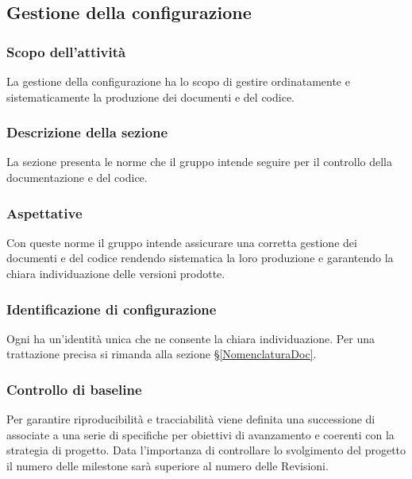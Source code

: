 \subsection{Gestione della configurazione}
\subsubsection{Scopo dell'attività} \label{PSup_GestioneConf_Scopo}
La gestione della configurazione ha lo scopo di gestire ordinatamente e sistematicamente la produzione dei documenti e del codice.

\subsubsection{Descrizione della sezione} 
La sezione presenta le norme che il gruppo intende seguire per il controllo della documentazione e del codice.

\subsubsection{Aspettative}
Con queste norme il gruppo intende assicurare una corretta gestione dei documenti e del codice rendendo sistematica la loro produzione e garantendo la chiara individuazione delle versioni prodotte.

\subsubsection{Identificazione di configurazione}
Ogni  ha un'identità unica che ne consente la chiara individuazione. Per una trattazione precisa si rimanda alla sezione \S\ref{NomenclaturaDoc}.

\subsubsection{Controllo di baseline}
Per garantire riproducibilità e tracciabilità viene definita una successione di  associate a una serie di  specifiche per obiettivi di avanzamento e coerenti con la strategia di progetto. Data l'importanza di controllare lo svolgimento del progetto il numero delle milestone sarà superiore al numero delle Revisioni.

